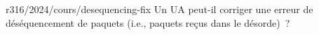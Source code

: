 \begin{question}{r316/2024/cours/desequencing-fix}
  Un UA peut-il corriger une erreur de déséquencement de paquets
  (i.e., paquets reçus dans le désorde)~?
  \begin{reponses}[2]
  \end{reponses}
\end{question}
